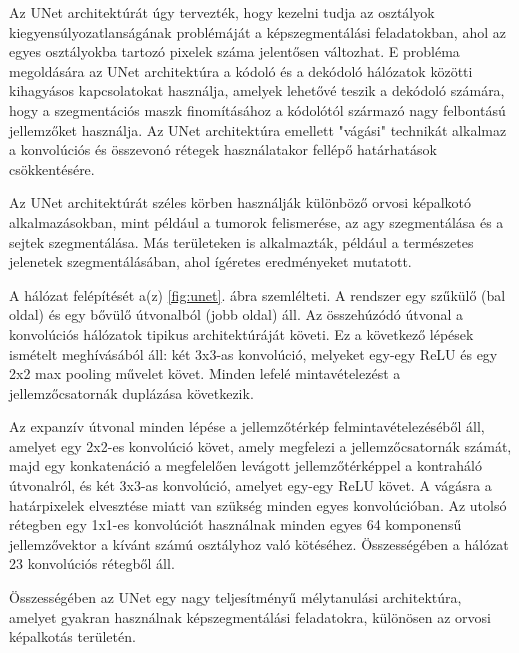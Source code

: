 \documentclass[12pt,a4]{article}
\begin{document}
                Az UNet architektúrát úgy tervezték, hogy kezelni tudja az osztályok kiegyensúlyozatlanságának problémáját a képszegmentálási feladatokban, ahol az egyes osztályokba tartozó pixelek száma jelentősen változhat. E probléma megoldására az UNet architektúra a kódoló és a dekódoló hálózatok közötti kihagyásos kapcsolatokat használja, amelyek lehetővé teszik a dekódoló számára, hogy a szegmentációs maszk finomításához a kódolótól származó nagy felbontású jellemzőket használja. Az UNet architektúra emellett "vágási" technikát alkalmaz a konvolúciós és összevonó rétegek használatakor fellépő határhatások csökkentésére.
    
                Az UNet architektúrát széles körben használják különböző orvosi képalkotó alkalmazásokban, mint például a tumorok felismerése, az agy szegmentálása és a sejtek szegmentálása. Más területeken is  alkalmazták, például a természetes jelenetek szegmentálásában, ahol ígéretes eredményeket mutatott.
    
                A hálózat felépítését a(z) \ref{fig:unet}. ábra szemlélteti. A rendszer egy szűkülő (bal oldal) és egy bővülő útvonalból (jobb oldal) áll. Az összehúzódó útvonal a konvolúciós hálózatok tipikus architektúráját követi.  Ez a következő lépések ismételt meghívásából áll: 
                két 3x3-as konvolúció, melyeket egy-egy ReLU és egy 2x2 max pooling művelet követ. Minden lefelé mintavételezést a jellemzőcsatornák duplázása következik. 
    
                Az expanzív útvonal minden lépése a jellemzőtérkép felmintavételezéséből áll, amelyet egy 2x2-es konvolúció követ, amely megfelezi a jellemzőcsatornák számát, majd egy konkatenáció a megfelelően levágott jellemzőtérképpel a kontraháló útvonalról, és két 3x3-as konvolúció, amelyet egy-egy ReLU követ. A vágásra a határpixelek elvesztése miatt van szükség minden egyes konvolúcióban. Az utolsó rétegben egy 1x1-es konvolúciót használnak minden egyes 64 komponensű jellemzővektor a kívánt számú osztályhoz való kötéséhez. Összességében a hálózat 23 konvolúciós rétegből áll.
    
                Összességében az UNet egy nagy teljesítményű mélytanulási architektúra, amelyet gyakran használnak képszegmentálási feladatokra, különösen az orvosi képalkotás területén. 
        
\end{document}
